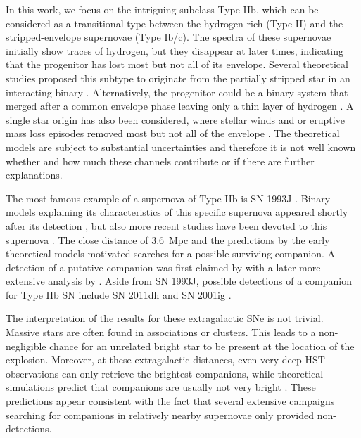 \documentclass{aa}
\begin{document}
In this work, we focus on the intriguing subclass Type IIb, which can be considered as a transitional type between the hydrogen-rich (Type II) and the stripped-envelope supernovae (Type Ib/c).  The spectra of these supernovae initially show traces of hydrogen, but they disappear at later times, indicating that the progenitor has lost most but not all of its envelope.  Several theoretical studies proposed this subtype to originate from the partially stripped star in an interacting binary  \citep{1993Natur.364..509P,2009MNRAS.396.1699S,2011A&A...528A.131C,2017ApJ...840...10Y}. Alternatively, the progenitor could be a binary system that merged after a common envelope phase leaving only a thin layer of hydrogen \citep{1995PhR...256..173N}.   A single star origin has also been considered, where stellar winds and or eruptive mass loss episodes removed most but not all of the envelope \citep{1994ApJ...429..300W,2012A&A...538L...8G}. The theoretical models are subject to substantial uncertainties and therefore it is not well known whether and how much these channels contribute or if there are further explanations.

The most famous example of a supernova of Type IIb is SN 1993J \citep{1993ApJ...415L.103F}. Binary models explaining its characteristics of this specific supernova appeared shortly after its detection \citep{1993Natur.364..509P,1995PhR...256..173N}, but also more recent studies have been devoted to this supernova \citep{2009MNRAS.396.1699S,2011A&A...528A.131C}.  The close distance of 3.6~Mpc and the predictions by the early theoretical models motivated searches for a possible surviving companion. A detection of a putative companion was first claimed by \citet{2004Natur.427..129M} with a later more extensive analysis by \citet{2014ApJ...790...17F}.  Aside from SN 1993J, possible detections of a companion for Type IIb SN include SN 2011dh \citep{2014ApJ...793L..22F,2015MNRAS.454.2580M} and SN 2001ig \citep{2006MNRAS.369L..32R}.

The interpretation of the results for these extragalactic SNe is not trivial. Massive stars are often found in associations or clusters. This leads to a non-negligible chance for an unrelated bright star to be present at the location of the explosion. Moreover, at these extragalactic distances, even very deep HST observations can only retrieve the brightest companions, while theoretical simulations predict that companions are usually not very bright \citep{2017ApJ...842..125Z}.  These predictions appear consistent with the fact that several extensive campaigns searching for companions in relatively nearby supernovae only provided non-detections.
\end{document}
